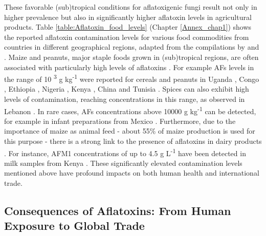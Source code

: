 These favorable (sub)tropical conditions for aflatoxigenic fungi result not only in higher prevalence but also in significantly higher aflatoxin levels in agricultural products. Table \ref{table:Aflatoxin_food_levels} (Chapter \ref{Annex_chap1}) shows the reported aflatoxin contamination levels for various food commodities from countries in different geographical regions, adapted from the compilations by \citet{jallow2021worldwide} and \citet{ismail2018aflatoxin}. Maize and peanuts, major staple foods grown in (sub)tropical regions, are often associated with particularly high levels of aflatoxins \citep{ismail2018aflatoxin}. For example \textSigma AFs levels in the range of 10 \textsuperscript{3} \textmu g kg\textsuperscript{-1} were reported for cereals and peanuts in Uganda \citep{sserumaga2020aflatoxin}, Congo \citep{kamika2016occurrence}, Ethiopia \citep{mohammed2016aspergillus}, Nigeria \citep{oyedele2017mycotoxin}, Kenya \citep{sirma2016aflatoxin}, China \citep{wu2016aflatoxin} and Tunisia \citep{houissa2019multimycotoxin}.
Spices can also exhibit high levels of contamination, reaching concentrations in this range, as observed in Lebanon \citep{el2019multimycotoxins}. In rare cases, \textSigma AFs concentrations above 10000 \textmu g kg\textsuperscript{-1} can be detected, for example in infant preparations from Mexico \citep{chala2013natural}. Furthermore, due to the importance of maize as animal feed - about 55\% of maize production is used for this purpose - there is a strong link to the presence of aflatoxins in dairy products \citep{tolosa2021multi}. For instance, AFM1 concentrations of up to 4.5 \textmu g L\textsuperscript{-1} have been detected in milk samples from Kenya \citep{kuboka2019occurrence}. These significantly elevated contamination levels mentioned above have profound impacts on both human health and international trade.

\subsection{Consequences of Aflatoxins: From Human Exposure to Global Trade} \label{subchap:AFs_consequences}

